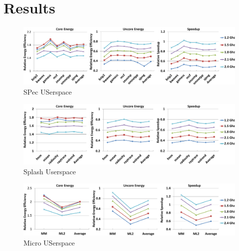 \section{Results}\label{sec:results}



\begin{figure}[htp]
  \begin{center}
\includegraphics[width=\linewidth]{figs/user-spec-crop.pdf}
  \end{center}
  \vspace{-0.1in}
  \caption{SPec USerspace}
  \label{fig:user-spec}
\end{figure}

\begin{figure}[htp]
  \begin{center}
\includegraphics[width=\linewidth]{figs/user-splash-crop.pdf}
  \end{center}
  \vspace{-0.1in}
  \caption{Splash Userspace}
  \label{fig:user-splash}
\end{figure}

\begin{figure}[htp]
  \begin{center}
\includegraphics[width=\linewidth]{figs/user-micro-crop.pdf}
  \end{center}
  \vspace{-0.1in}
  \caption{Micro USerspace}
  \label{fig:user-micro}
\end{figure}



